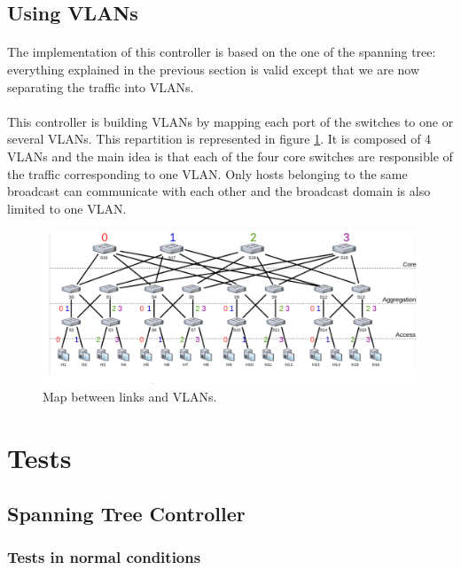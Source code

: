 \documentclass[a4paper, 11pt, oneside]{article}
\begin{document}
\subsection{Using VLANs}
\paragraph{}The implementation of this controller is based on the one of the spanning tree: everything explained in the previous section is valid except that we are now separating the traffic into VLANs.
\paragraph{}This controller is building VLANs by mapping each port of the switches to one or several VLANs. This repartition is represented in figure \ref{VLANs_rep}. It is composed of 4 VLANs and the main idea is that each of the four core switches are responsible of the traffic corresponding to one VLAN. 
Only hosts belonging to the same broadcast can communicate with each other and the broadcast domain is also limited to one VLAN.

\begin{figure}[H]
    \center
    \includegraphics[scale = 0.4]{VLANs/VLANs.png}
    \caption{Map between links and VLANs.}
    \label{VLANs_rep}
    \end{figure}

\section{Tests}

\subsection{Spanning Tree Controller}
\subsubsection{Tests in normal conditions}
\end{document}
